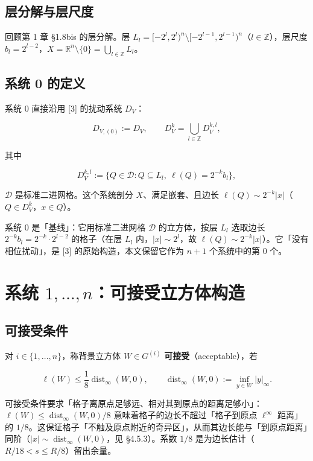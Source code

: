 \documentclass[a4paper,11pt,openany]{ctexbook}
\numberwithin{equation}{chapter}
\numberwithin{figure}{chapter}
\numberwithin{table}{chapter}
\begin{document}
\subsection{层分解与层尺度}

回顾第 1 章 §1.8bis 的层分解。层 $L_l=[-2^l,2^l)^n\setminus[-2^{l-1},2^{l-1})^n$（$l\in\mathbb Z$），层尺度 $b_l=2^{l-2}$，$X=\mathbb R^n\setminus\{0\}=\bigcup_{l\in\mathbb Z}L_l$。

\subsection{系统 0 的定义}

系统 $0$ 直接沿用 [3] 的扰动系统 $D_V$：

$$D_{V,(0)}:=D_V,\qquad D_V^k=\bigcup_{l\in\mathbb Z}D_V^{k,l},$$

其中

$$D_V^{k,l}:=\{Q\in\mathcal D: Q\subseteq L_l,\ \ell(Q)=2^{-k}b_l\},$$

$\mathcal D$ 是标准二进网格。这个系统剖分 $X$、满足嵌套、且边长 $\ell(Q)\sim2^{-k}|x|$（$Q\in D_V^k$，$x\in Q$）。

\begin{intuitionbox}
系统 0 是「基线」：它用标准二进网格 $\mathcal D$ 的立方体，按层 $L_l$ 选取边长 $2^{-k}b_l=2^{-k}\cdot2^{l-2}$ 的格子（在层 $L_l$ 内，$|x|\sim2^l$，故 $\ell(Q)\sim2^{-k}|x|$）。它「没有相位扰动」，是 [3] 的原始构造，本文保留它作为 $n+1$ 个系统中的第 $0$ 个。
\end{intuitionbox}

\section{系统 $1,\dots,n$：可接受立方体构造}

\subsection{可接受条件}

对 $i\in\{1,\dots,n\}$，称背景立方体 $W\in G^{(i)}$ \textbf{可接受}（acceptable），若

$$\ell(W)\le\frac18\operatorname{dist}_\infty(W,0),\qquad \operatorname{dist}_\infty(W,0):=\inf_{y\in W}|y|_\infty .$$

\begin{intuitionbox}
可接受条件要求「格子离原点足够远、相对其到原点的距离足够小」：$\ell(W)\le\operatorname{dist}_\infty(W,0)/8$ 意味着格子的边长不超过「格子到原点 $\ell^\infty$ 距离」的 $1/8$。这保证格子「不触及原点附近的奇异区」，从而其边长能与「到原点距离」同阶（$|x|\sim\operatorname{dist}_\infty(W,0)$，见 §4.5.3）。系数 $1/8$ 是为边长估计（$R/18<s\le R/8$）留出余量。
\end{intuitionbox}
\end{document}
